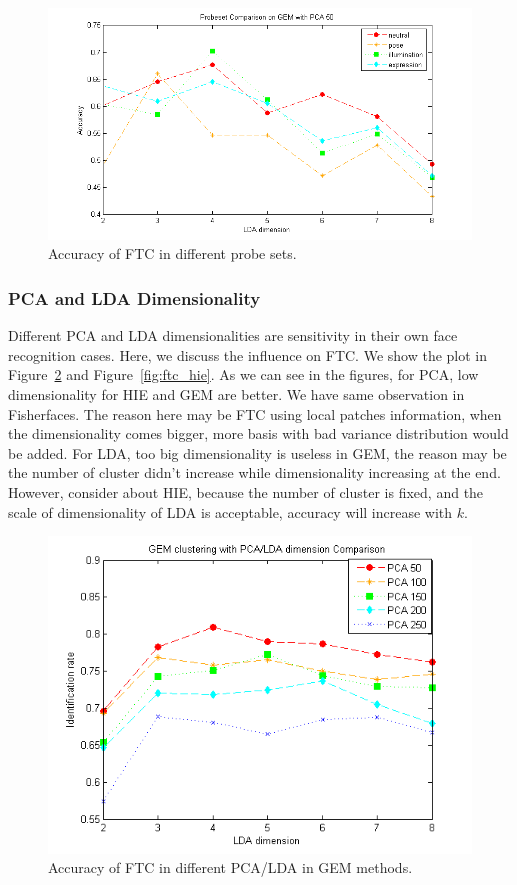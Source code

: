 \documentclass[10pt,twocolumn,letterpaper]{article}
\begin{document}
\begin{figure}[t]
    \begin{center}
        \includegraphics[width=0.8\linewidth]{fig/ftc/ftc_sets.png}
    \end{center}
    \caption{Accuracy of FTC in different probe sets.}
    \label{fig:ftc_sets}
\end{figure}


\subsubsection{PCA and LDA Dimensionality}
Different PCA and LDA dimensionalities are sensitivity in their own face 
recognition cases. Here, we discuss the influence on FTC. We show the
plot in Figure~\ref{fig:ftc_gem} and Figure~\ref{fig:ftc_hie}. As we
can see in the figures, for PCA, low dimensionality for HIE and GEM
are better. We have same observation in Fisherfaces. The reason here may
be FTC using local patches information, when the dimensionality comes bigger,
more basis with bad variance distribution would be added.
For LDA, too big dimensionality is useless in GEM, the reason may be the
number of cluster didn't increase while dimensionality increasing at the end.
However, consider about HIE, because the number of cluster is fixed,
and the scale of dimensionality of LDA is acceptable, accuracy will increase
with $k$.

\begin{figure}[t]
    \begin{center}
        \includegraphics[width=0.8\linewidth]{fig/ftc/ftc_gem.png}
    \end{center}
    \caption{Accuracy of FTC in different PCA/LDA in GEM methods.}
    \label{fig:ftc_gem}
\end{figure}
\end{document}
